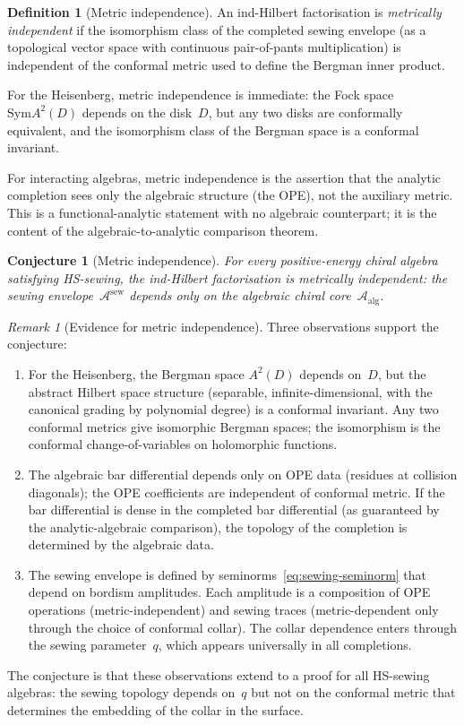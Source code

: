 \documentclass[11pt,reqno]{amsart}
\newtheorem{conjecture}[theorem]{Conjecture}
\theoremstyle{definition}
\newtheorem{definition}[theorem]{Definition}
\theoremstyle{remark}
\newtheorem{remark}[theorem]{Remark}
\newcommand{\cA}{\mathcal{A}}
\newcommand{\Sym}{\mathrm{Sym}}
\numberwithin{equation}{section}
\begin{document}
\begin{definition}[Metric independence]
\label{def:metric-independence}
An ind-Hilbert factorisation is \emph{metrically independent}
if the isomorphism class of the completed sewing envelope
(as a topological vector space with continuous pair-of-pants
multiplication) is independent of the conformal metric used to
define the Bergman inner product.
\end{definition}

For the Heisenberg, metric independence is immediate: the Fock
space $\Sym A^2(D)$ depends on the disk~$D$, but any two disks
are conformally equivalent, and the isomorphism class of the
Bergman space is a conformal invariant.

For interacting algebras, metric independence is the assertion
that the analytic completion sees only the algebraic structure
(the OPE), not the auxiliary metric.  This is a functional-analytic
statement with no algebraic counterpart; it is the content of
the algebraic-to-analytic comparison theorem.

\begin{conjecture}[Metric independence]
\label{conj:metric-independence}
For every positive-energy chiral algebra satisfying HS-sewing,
the ind-Hilbert factorisation is metrically independent: the
sewing envelope~$\cA^{\mathrm{sew}}$ depends only on the
algebraic chiral core~$\cA_{\mathrm{alg}}$.
\end{conjecture}

\begin{remark}[Evidence for metric independence]
\label{rem:metric-evidence}
Three observations support the conjecture:
\begin{enumerate}[label=\textup{(\alph*)}]
\item For the Heisenberg, the Bergman space $A^2(D)$ depends
 on~$D$, but the abstract Hilbert space structure (separable,
 infinite-dimensional, with the canonical grading by polynomial
 degree) is a conformal invariant.  Any two conformal metrics
 give isomorphic Bergman spaces; the isomorphism is the
 conformal change-of-variables on holomorphic functions.
\item The algebraic bar differential depends only on OPE data
 (residues at collision diagonals); the OPE coefficients are
 independent of conformal metric.  If the bar differential
 is dense in the completed bar differential (as guaranteed by
 the analytic-algebraic comparison), the topology of the
 completion is determined by the algebraic data.
\item The sewing envelope is defined by
 seminorms~\eqref{eq:sewing-seminorm} that depend on bordism
 amplitudes.  Each amplitude is a composition of OPE operations
 (metric-independent) and sewing traces (metric-dependent only
 through the choice of conformal collar).  The collar dependence
 enters through the sewing parameter~$q$, which appears
 universally in all completions.
\end{enumerate}
The conjecture is that these observations extend to a proof for
all HS-sewing algebras: the sewing topology depends on~$q$ but
not on the conformal metric that determines the embedding of
the collar in the surface.
\end{remark}
\end{document}
